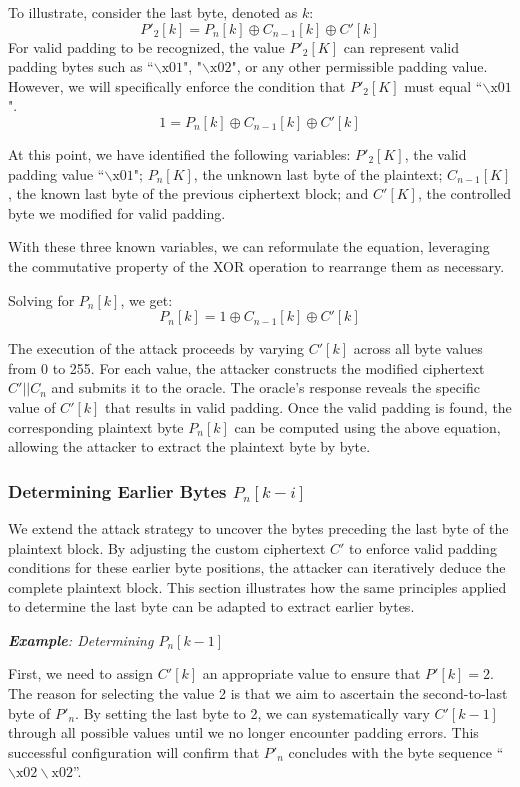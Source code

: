 \documentclass[conference]{IEEEtran}
\begin{document}
To illustrate, consider the last byte, denoted as \(k\):
\[
P'_2[k] = P_n[k] \oplus C_{n-1}[k] \oplus C'[k]
\]
For valid padding to be recognized, the value \( P'_{2}[K] \) can represent valid padding bytes such as ``$\backslash\text{x}01$", "$\backslash\text{x}02$", or any other permissible padding value. However, we will specifically enforce the condition that \( P'_{2}[K] \) must equal ``$\backslash\text{x}01$".
\[
1 = P_n[k] \oplus C_{n-1}[k] \oplus C'[k]
\]

At this point, we have identified the following variables: \( P'_{2}[K] \), the valid padding value ``$\backslash \text{x01}$"; \( P_{n}[K] \), the unknown last byte of the plaintext; \( C_{n-1}[K] \), the known last byte of the previous ciphertext block; and \( C'{[K]} \), the controlled byte we modified for valid padding. 

With these three known variables, we can reformulate the equation, leveraging the commutative property of the XOR operation to rearrange them as necessary.



Solving for \(P_n[k]\), we get:
\[
P_n[k] = 1 \oplus C_{n-1}[k] \oplus C'[k]
\]

The execution of the attack proceeds by varying \(C'[k]\) across all byte values from 0 to 255. For each value, the attacker constructs the modified ciphertext \(C' || C_n\) and submits it to the oracle. The oracle's response reveals the specific value of \(C'[k]\) that results in valid padding. Once the valid padding is found, the corresponding plaintext byte \(P_n[k]\) can be computed using the above equation, allowing the attacker to extract the plaintext byte by byte.

\newpage
\subsubsection{Determining Earlier Bytes \(P_n[k-i]\)}
We extend the attack strategy to uncover the bytes preceding the last byte of the plaintext block. By adjusting the custom ciphertext \(C'\) to enforce valid padding conditions for these earlier byte positions, the attacker can iteratively deduce the complete plaintext block. This section illustrates how the same principles applied to determine the last byte can be adapted to extract earlier bytes.

\textit{{\bf Example}: Determining \(P_n[k-1]\)}

First, we need to assign \( C'{[k]} \) an appropriate value to ensure that \( P'{[k]} = 2 \). The reason for selecting the value 2 is that we aim to ascertain the second-to-last byte of \( P'_{n} \). By setting the last byte to 2, we can systematically vary \( C'{[k-1]} \) through all possible values until we no longer encounter padding errors. This successful configuration will confirm that \( P'_{n} \) concludes with the byte sequence ``$\backslash \text{x02}\backslash \text{x02}$”.
\end{document}
